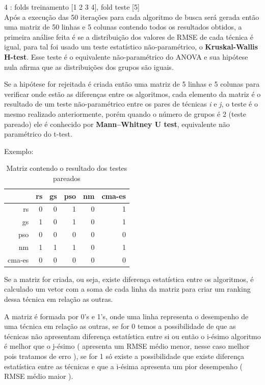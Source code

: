 \documentclass[preprint,12pt]{elsarticle}
\begin{document}
4 : folds treinamento [1 2 3 4], fold teste [5] \\



Após a execução das 50 iterações para cada algoritmo de busca será gerada então uma matriz de 50 linhas e 5 colunas contendo todos os resultados obtidos, a primeira análise feita é se a distribuição dos valores de RMSE de cada técnica é igual, para tal foi usado um teste estatístico não-paramétrico, o \textbf{Kruskal-Wallis H-test}. Esse teste é o equivalente não-paramétrico do ANOVA e sua hipótese nula afirma que as distribuições dos grupos são iguais.

Se a hipótese for rejeitada é criada então uma matriz de 5 linhas e 5 colunas para verificar onde estão as diferenças entre os algoritmos, cada elemento da matriz é o resultado de um teste não-paramétrico entre os pares de técnicas \textit{i} e \textit{j}, o teste é o mesmo realizado anteriormente, porém quando o número de grupos é 2 (teste pareado) ele é conhecido por \textbf{Mann–Whitney U test}, equivalente não paramétrico do t-test.

Exemplo:


\begin{table}[h]
	\centering
	\begin{tabular}{|r|r|r|r|r|r|}
		\hline
		& rs & gs & pso & nm & cma-es \\
		\hline
		rs & 0 &   0 &   1 &   0 &   1 \\
		\hline
		gs & 1 &     0 &     1 &     0 &     1 \\
		\hline		
		pso & 0 &     0 &     0 &     0 &     0 \\
		\hline		
		nm & 1 &     1 &     1 &     0 &     1 \\
		\hline		
		cma-es & 0 &     0 &     0 &     0 &     0 \\
		\hline
	\end{tabular}
	\caption{Matriz contendo o resultado dos testes pareados}
\end{table}




Se a matriz for criada, ou seja, existe diferença estatística entre os algoritmos, é calculado um vetor com a soma de cada linha da matriz para criar um ranking dessa técnica em relação as outras. 

A matriz é formada por 0's e 1's, onde uma linha representa o desempenho de uma técnica em relação as outras, se for 0 temos a possibilidade de que as técnicas não apresentam diferença estatística entre si ou então o i-ésimo algoritmo é melhor que o j-ésimo ( apresenta um RMSE médio menor, nesse caso melhor pois tratamos de erro ), se for 1 só existe a possibilidade que existe diferença estatística entre as técnicas e que a i-ésima apresenta um pior desempenho ( RMSE médio maior ).
\end{document}
